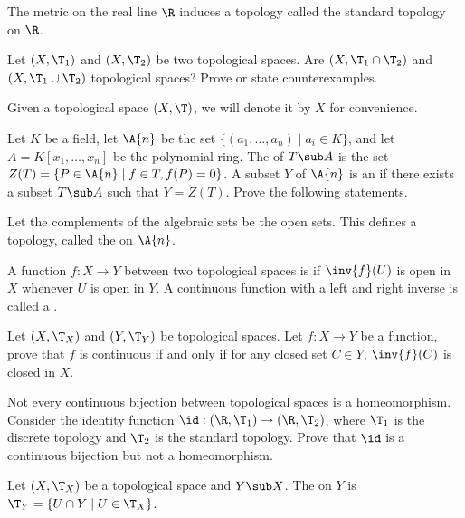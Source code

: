 \documentclass[10pt]{article}
\begin{document}
\par
The metric on the real line $\R$ induces a topology called the standard topology on $\R$.
\begin{problem}
    Let $(X,{\T}_{1})$ and $(X,{\T}_{2})$ be two topological spaces. Are $(X,{\T}_{1}\cap{\T}_{2})$ and $(X,{\T}_{1}\cup{\T}_{2})$ topological spaces? Prove or state counterexamples.
\end{problem}
\begin{remark}
    Given a topological space $(X,\T)$, we will denote it by $X$ for convenience.
\end{remark}
\begin{problem}
    Let $K$ be a field, let $\A{n}$ be the set $\{({a}_{1},\dots,{a}_{n})\mid{a}_{i}\in K\}$, and let $A=K[{x}_{1},\dots,{x}_{n}]$ be the polynomial ring. The  of $T\sub A$ is the set $Z(T)=\{P\in\A{n}\mid f\in T,f(P)=0\}$. A subset $Y$ of $\A{n}$ is an  if there exists a subset $T\sub A$ such that $Y=Z(T)$. Prove the following statements.
    
    
    
    Let the complements of the algebraic sets be the open sets. This defines a topology, called the  on $\A{n}$.
\end{problem}
\begin{definition}
    A function $f:X\to Y$ between two topological spaces is  if $\inv{f}(U)$ is open in $X$ whenever $U$ is open in $Y$. A continuous function with a left and right inverse is called a .
\end{definition}
\begin{problem}
    Let $(X,{\T}_{X})$ and $(Y,{\T}_{Y})$ be topological spaces. Let $f:X\to Y$ be a function, prove that $f$ is continuous if and only if for any closed set $C\in Y$, $\inv{f}(C)$ is closed in $X$.
\end{problem}
\begin{problem}
    Not every continuous bijection between topological spaces is a homeomorphism. Consider the identity function $\id:(\R,{\T}_{1})\to(\R,{\T}_{2})$, where ${\T}_{1}$ is the discrete topology and ${\T}_{2}$ is the standard topology. Prove that $\id$ is a continuous bijection but not a homeomorphism.
\end{problem}
\begin{definition}
    Let $(X,{\T}_{X})$ be a topological space and $Y\sub X$. The  on $Y$ is ${\T}_{Y}=\{U\cap Y\mid U\in{\T}_{X}\}$.
\end{definition}
\end{document}
